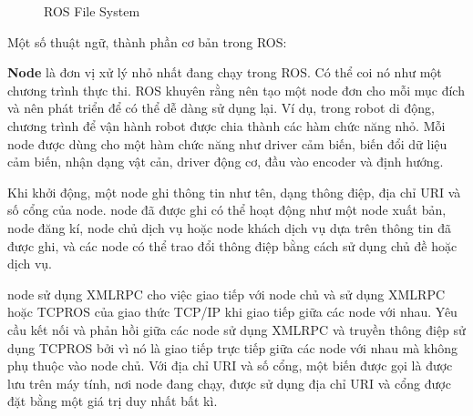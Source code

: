 \begin{figure}[htbp]
    \centering
  \caption{ROS File System}
  \label{fig:ros-filesystem}
\end{figure}

Một số thuật ngữ, thành phần cơ bản trong ROS: 

\textbf{Node} là đơn vị xử lý nhỏ nhất đang chạy trong ROS. Có thể coi nó như một chương trình thực thi. ROS khuyên rằng nên tạo một node đơn cho mỗi mục đích và nên phát triển để có thể dễ dàng sử dụng lại. Ví dụ, trong robot di động, chương trình để vận hành robot được chia thành các hàm chức năng nhỏ. Mỗi node được dùng cho một hàm chức năng như driver cảm biến, biến đổi dữ liệu cảm biến, nhận dạng vật cản, driver động cơ, đầu vào encoder và định hướng.

Khi khởi động, một node ghi thông tin như tên, dạng thông điệp, địa chỉ URI và số cổng của node. node đã được ghi có thể hoạt động như một node xuất bản, node đăng kí, node chủ dịch vụ hoặc node khách dịch vụ dựa trên thông tin đã được ghi, và các node có thể trao đổi thông điệp bằng cách sử dụng chủ đề hoặc dịch vụ.

node sử dụng XMLRPC cho việc giao tiếp với node chủ và sử dụng XMLRPC hoặc TCPROS của giao thức TCP/IP khi giao tiếp giữa các node với nhau. Yêu cầu kết nối và phản hồi giữa các node sử dụng XMLRPC và truyền thông điệp sử dụng TCPROS bởi vì nó là giao tiếp trực tiếp giữa các node với nhau mà không phụ thuộc vào node chủ. Với địa chỉ URI và số cổng, một biến được gọi là  được lưu trên máy tính, nơi node đang chạy, được sử dụng địa chỉ URI và cổng được đặt bằng một giá trị duy nhất bất kì.

